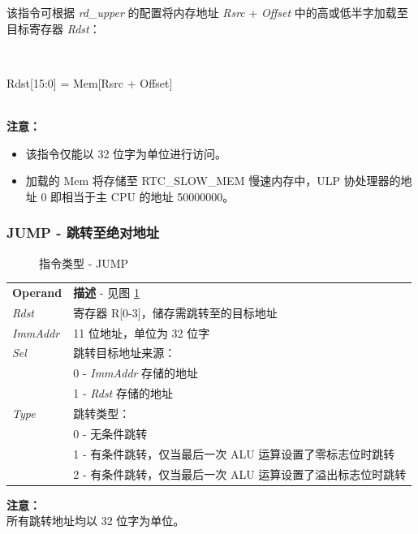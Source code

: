 \documentclass[main\_\_CN.tex]{subfiles}
\begin{document}
该指令可根据 \textit{rd\_upper} 的配置将内存地址 \textit{Rsrc} + \textit{Offset} 中的高或低半字加载至目标寄存器 \textit{Rdst}：

~
\begin{centering}
    Rdst[15:0] = Mem[Rsrc + Offset] \\
\end{centering}
~\\

\textbf{注意：}
\begin{itemize}
    \item 该指令仅能以 32 位字为单位进行访问。
    \item 加载的 Mem 将存储至 RTC\_SLOW\_MEM 慢速内存中，ULP 协处理器的地址 0 即相当于主 CPU 的地址 \hexprefix{}50000000。
\end{itemize}


\subsubsection {JUMP - 跳转至绝对地址} \label{paragraph:JUMP}

%
%
%
%
%
%
%
%
\begin{figure}[!ht]
    \centering
    \caption{指令类型 - JUMP}
    \label{figure:JUMP}
\end{figure}

\begin{tabular}{ l l }
\textbf{Operand} & \textbf{描述} - 见图 \ref{figure:JUMP} \\
\textit{Rdst} & 寄存器 R[0-3]，储存需跳转至的目标地址 \\
\textit{ImmAddr} & 11 位地址，单位为 32 位字\\
\textit{Sel} & 跳转目标地址来源： \\
 & 0 - \textit{ImmAddr} 存储的地址\\
 & 1 - \textit{Rdst} 存储的地址 \\
\textit{Type} & 跳转类型： \\
 & 0 - 无条件跳转 \\
 & 1 - 有条件跳转，仅当最后一次 ALU 运算设置了零标志位时跳转 \\
 & 2 - 有条件跳转，仅当最后一次 ALU 运算设置了溢出标志位时跳转
\end{tabular}

\textbf{注意：} \\
所有跳转地址均以 32 位字为单位。
\end{document}
